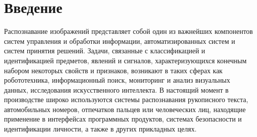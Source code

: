 \chapter*{Введение}

Распознавание изображений представляет собой один из важнейших компонентов систем управления и обработки информации, автоматизированных систем и систем принятия решений. Задачи, связанные с классификацией и идентификацией предметов, явлений и сигналов, характеризующихся конечным набором некоторых свойств и признаков, возникают в таких сферах как робототехника, информационный поиск, мониторинг и анализ визуальных данных, исследования искусственного интеллекта. В настоящий момент в производстве широко используются системы распознавания рукописного текста, автомобильных номеров, отпечатков пальцев или человеческих лиц, находящие применение в интерфейсах программных продуктов, системах безопасности и идентификации личности, а также в других прикладных целях.

